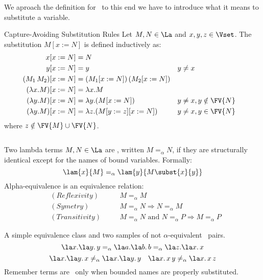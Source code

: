 We aproach the definition for \aequiv \, to this end we have to introduce what it means to substitute a variable.

\begin{definition}Capture-Avoiding Substitution Rules
  Let \( M, N \in \La \) and \( x, y, z \in \Vset \). The substitution \( M[x := N] \) is defined inductively as:
  \[
    \begin{aligned}
      x[x := N]                       & = N \\
      y[x := N]                       & = y && y \neq x \\
      (M_1\, M_2)[x := N]             & = (M_1[x := N])\,(M_2[x := N]) \\
      (\lambda x. M)[x := N]          & = \lambda x. M \\
      (\lambda y. M)[x := N]          & = \lambda y. (M[x := N]) && y \neq x, y \notin \FV { N } \\
      (\lambda y. M)[x := N]          & = \lambda z. (M[y := z][x := N]) && y \neq x, y \in \FV { N }
    \end{aligned}
  \]
  where \( z \notin \FV { M } \cup \FV { N } \).
  \begin{lstlisting}[style=haskellstyle,caption={asdasdasd}]

  \end{lstlisting}
\end{definition}
\begin{definition} Two lambda terms \( M, N \in \La \) are \aequivlt, written \( M =_\alpha N \), if they are structurally identical except for the names of bound variables.
  Formally:
  \[
    \lam{x}{M} =_\alpha \lam{y}{M\subst{x}{y}}
  \]
  Alpha-equivalence is an equivalence relation:
  \[
    \begin{aligned}
      &(Reflexivity) \quad && M =_\alpha M \\
      &(Symetry) \quad && M =_\alpha N \Rightarrow N =_\alpha M \\ 
      &(Transitivity) \quad && M =_\alpha N \text{ and } N =_\alpha P \Rightarrow M =_\alpha P
    \end{aligned}
  \]
\end{definition}
\begin{example} A simple equivalence class and two samples of not $\alpha$-equivalent \ pairs.
  \[
    \la x.\la y. \, y =_\alpha \la a.\la b. \, b =_\alpha \la z.\la x. \, x
  \]
  \[
    \la x. \la y. \, x \not=_\alpha \la x. \la y. \, y \quad \la x. \, x \, y \not=_\alpha \la x. \, x \, z 
  \]
  Remember terms are \aequiv \ only when bounded names are properly substituted.
\end{example}
